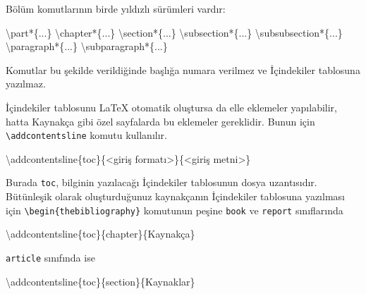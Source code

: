 \documentclass[
  10pt,
]{scrbook}
\newenvironment{Shaded}{\begin{snugshade}}{\end{snugshade}}
\newcommand{\NormalTok}[1]{#1}
\newcommand{\SpecialCharTok}[1]{\textcolor[rgb]{0.00,0.00,0.00}{#1}}
\begin{document}
Bölüm komutlarının birde yıldızlı sürümleri vardır:

\begin{Shaded}
\begin{Highlighting}[]
\NormalTok{\textbackslash{}part}\SpecialCharTok{*}\NormalTok{\{...\}}
\NormalTok{\textbackslash{}chapter}\SpecialCharTok{*}\NormalTok{\{...\}}
\NormalTok{\textbackslash{}section}\SpecialCharTok{*}\NormalTok{\{...\}}
\NormalTok{\textbackslash{}subsection}\SpecialCharTok{*}\NormalTok{\{...\}}
\NormalTok{\textbackslash{}subsubsection}\SpecialCharTok{*}\NormalTok{\{...\}}
\NormalTok{\textbackslash{}paragraph}\SpecialCharTok{*}\NormalTok{\{...\}}
\NormalTok{\textbackslash{}subparagraph}\SpecialCharTok{*}\NormalTok{\{...\}}
\end{Highlighting}
\end{Shaded}

Komutlar bu şekilde verildiğinde başlığa numara verilmez ve İçindekiler
tablosuna yazılmaz.

İçindekiler tablosunu LaTeX otomatik oluştursa da elle eklemeler
yapılabilir, hatta Kaynakça gibi özel sayfalarda bu eklemeler
gereklidir. Bunun için \texttt{\textbackslash{}addcontentsline} komutu kullanılır.

\begin{Shaded}
\begin{Highlighting}[]
\NormalTok{\textbackslash{}addcontentsline\{toc\}\{}\SpecialCharTok{\textless{}}\NormalTok{giriş formatı}\SpecialCharTok{\textgreater{}}\NormalTok{\}\{}\SpecialCharTok{\textless{}}\NormalTok{giriş metni}\SpecialCharTok{\textgreater{}}\NormalTok{\}}
\end{Highlighting}
\end{Shaded}

Burada \texttt{toc}, bilginin yazılacağı İçindekiler tablosunun dosya
uzantısıdır. Bütünleşik olarak oluşturduğunuz
kaynakçanın İçindekiler tablosuna yazılması için
\texttt{\textbackslash{}begin\{thebibliography\}} komutunun peşine \texttt{book} ve \texttt{report}
sınıflarında

\begin{Shaded}
\begin{Highlighting}[]
\NormalTok{\textbackslash{}addcontentsline\{toc\}\{chapter\}\{Kaynakça\}}
\end{Highlighting}
\end{Shaded}

\texttt{article} sınıfında ise

\begin{Shaded}
\begin{Highlighting}[]
\NormalTok{\textbackslash{}addcontentsline\{toc\}\{section\}\{Kaynaklar\}}
\end{Highlighting}
\end{Shaded}
\end{document}

